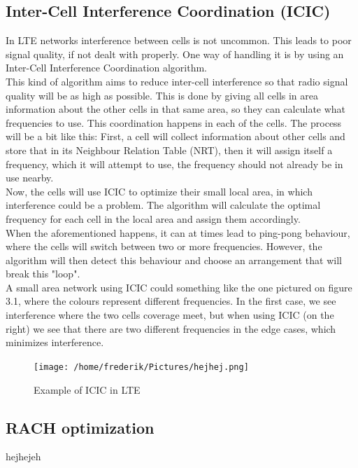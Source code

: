\documentclass{report}
\begin{document}
\subsection{Inter-Cell Interference Coordination (ICIC)}
In LTE networks interference between cells is not uncommon. This leads to poor signal quality, if not dealt with properly. One way of handling it is by using an Inter-Cell Interference Coordination algorithm. \\ This kind of algorithm aims to reduce inter-cell interference so that  radio signal quality will be as high as possible. This is done by giving all cells in area information about the other cells in that same area, so they can calculate what frequencies to use. This coordination happens in each of the cells. The process will be a bit like this: 
First, a cell will collect information about other cells and store that in its Neighbour Relation Table (NRT), then it will assign itself a frequency, which it will attempt to use, the frequency should not already be in use nearby. \\ Now, the cells will use ICIC to optimize their small local area, in which interference could be a problem. The algorithm will calculate the optimal frequency for each cell in the local area and assign them accordingly. \\ When the aforementioned happens, it can at times lead to ping-pong behaviour, where the cells will switch between two or more frequencies. However, the algorithm will then detect this behaviour and choose an arrangement that will break this "loop". \cite{Karla2010} \\ A small area network using ICIC could something like the one pictured on figure 3.1, where the colours represent different frequencies. In the first case, we see interference where the two cells coverage meet, but when using ICIC (on the right) we see that there are two different frequencies in the edge cases, which minimizes interference.
\newpage

\begin{figure}[!t]
	\centering
	\texttt{[image: /home/frederik/Pictures/hejhej.png]}
	\caption{Example of ICIC in LTE \cite{Henrik}}
\end{figure}


\subsection{RACH optimization}
hejhejeh
\end{document}
